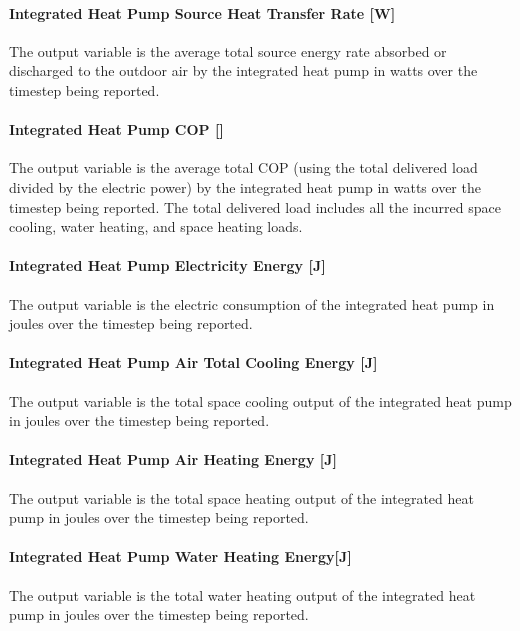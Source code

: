 \paragraph{Integrated Heat Pump Source Heat Transfer Rate {[}W{]}}\label{Out-Total-Source-Energy-Rate-ASIHP}

The output variable is the average total source energy rate absorbed or discharged to the outdoor air by the integrated heat pump in watts over the timestep being reported.


\paragraph{Integrated Heat Pump COP {[}{]}}\label{Out-Tot-COP-ASIHP}

The output variable is the average total COP (using the total delivered load divided by the electric power) by the integrated heat pump in watts over the timestep being reported. The total delivered load includes all the incurred space cooling, water heating, and space heating loads.


\paragraph{Integrated Heat Pump Electricity Energy {[}J{]}}\label{Out-Total-Electric-Energy-ASIHP}

The output variable is the electric consumption of the integrated heat pump in joules over the timestep being reported.


\paragraph{Integrated Heat Pump Air Total Cooling Energy {[}J{]}}\label{Out-Total-Cooling-Energy-ASIHP}
The output variable is the total space cooling output of the integrated heat pump in joules over the timestep being reported.


\paragraph{Integrated Heat Pump Air Heating Energy {[}J{]}}\label{Out-Total-Air-Heating-Energy-ASIHP}

The output variable is the total space heating output of the integrated heat pump in joules over the timestep being reported.

\paragraph{Integrated Heat Pump Water Heating Energy{[}J{]}}\label{Out-Total-WH-Energy-ASIHP}
The output variable is the total water heating output of the integrated heat pump in joules over the timestep being reported.


